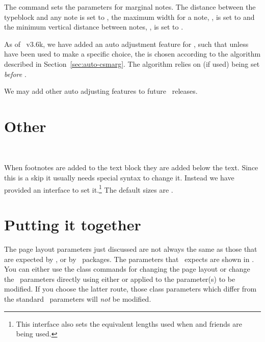 The command \cmd{\setmarginnotes}
sets the parameters for marginal notes. The distance \lnc{\marginparsep} 
between the typeblock and any note is set 
to , the 
maximum width for a note, \lnc{\marginparwidth}, is set to 
and the minimum vertical distance between notes, \lnc{\marginparpush},
is set to .

\begin{note}
  As of \theclass\ v3.6k, we have added an auto adjustment feature for
  \lnc{\marginparwidth}, such that unless \cmd{\setmarginnotes} have
  been used to make a specific choice, the \lnc{\marginparwidth} is
  chosen according to the algorithm described in
  Section~\ref{sec:auto-csmarg}. The algorithm relies on
  \cmd{\marginparmargin} (if used) being set \emph{before}
  \cmd{\checkandfixthelayout}.

  We may add other auto adjusting features to future \theclass\ releases.
\end{note}



\section{Other}
\label{sec:other}


\begin{syntax}
\cmd{\setfootins} \\
\end{syntax}

\noindent
When footnotes are added to the text block they are added
 below the text. Since this is a skip it usually
needs special syntax to change it. Instead we have provided an
interface to set it.\footnote{This interface also sets the equivalent
  lengths used when  and friends are being
  used.} The default sizes are .




\section{Putting it together}

    The page layout parameters 
just discussed are not always the same
as those that are expected by \ltx, or by \ltx\ packages. The parameters
that \ltx\ expects are shown in . You can either use
the class commands for changing the page layout or change the \ltx\ 
parameters
directly using either \cmd{\setlength} or \cmd{\addtolength} applied to the
parameter(s) to be modified. If you choose the latter route, those class 
parameters which differ from the standard \ltx\ parameters will \emph{not} be
modified. 

